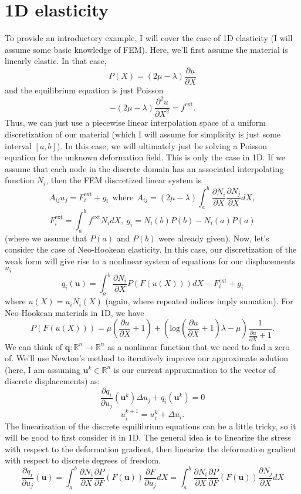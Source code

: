 \section*{1D elasticity}
To provide an introductory example, I will cover the case of 1D elasticity (I will assume some basic knowledge of FEM). Here, we'll first assume the material is linearly elastic. In that case,
$$
P(X)=(2\mu-\lambda)\frac{\partial{u}}{\partial{X}}
$$
and the equilibrium equation is just Poisson
$$
-(2\mu-\lambda)\frac{\partial^2{u}}{\partial{X}^2}=f^\textrm{ext}.
$$
Thus, we can just use a piecewise linear interpolation space of a uniform discretization of our material (which I will assume for simplicity is just some interval $[a,b]$). In this case, we will ultimately just be solving a Poisson equation for the unknown deformation field. This is only the case in 1D. If we assume that each node in the discrete domain has an associated interpolating function $N_i$, then the FEM discretized linear system is
$$
A_{ij}u_j=F^\textrm{ext}_i+g_i \ \ \textrm{where} \ \ A_{ij}=(2\mu-\lambda)\int_a^b\frac{\partial{N_i}}{\partial{X}}\frac{\partial{N_j}}{\partial{X}}dX, 
$$
$$
F^\textrm{ext}_i=\int_a^bf^\textrm{ext}N_idX, \ g_i=N_i(b)P(b)-N_i(a)P(a)
$$
(where we assume that $P(a)$ and $P(b)$ were already given). Now, let's consider the case of Neo-Hookean elasticity. In this case, our discretization of the weak form will give rise to a nonlinear system of equations for our displacements $u_i$
$$
q_i(\mathbf{u})=\int_a^b\frac{\partial{N_i}}{\partial{X}}P(F(u(X)))dX-F^\textrm{ext}_i+g_i
$$
where $u(X)=u_iN_i(X)$ (again, where repeated indices imply sumation). For Neo-Hookean materials in 1D, we have
$$
P(F(u(X)))=\mu(\frac{\partial{u}}{\partial{X}}+1)+(\textrm{log}(\frac{\partial{u}}{\partial{X}}+1)\lambda-\mu)\frac{1}{\frac{\partial{u}}{\partial{X}}+1}.
$$
We can think of $\mathbf{q}:\mathbb{R}^n\rightarrow\mathbb{R}^n$ as a nonlinear function that we need to find a zero of. We'll use Newton's method to iteratively improve our approximate solution (here, I am assuming $\mathbf{u}^k\in\mathbb{R}^n$ is our current approximation to the vector of discrete displacements) as:
$$
\frac{\partial{q_i}}{\partial{u_j}}(\mathbf{u}^k)\Delta{u}_j+q_i(\mathbf{u}^k)=0
$$
$$
u_i^{k+1}=u_i^{k}+\Delta{u}_i.
$$
The linearization of the discrete equilibrium equations can be a little tricky, so it will be good to first consider it in 1D. The general idea is to linearize the stress with respect to the deformation gradient, then linearize the deformation gradient with respect to discrete degrees of freedom.
$$
\frac{\partial{q}_i}{\partial{u}_j}(\mathbf{u})=\int_a^b\frac{\partial{N_i}}{\partial{X}}\frac{\partial{P}}{\partial{F}}(F(\mathbf{u}))\frac{\partial{F}}{\partial{u}_j}dX=\int_a^b\frac{\partial{N_i}}{\partial{X}}\frac{\partial{P}}{\partial{F}}(F(\mathbf{u}))\frac{\partial{N_j}}{\partial{X}}dX
$$
